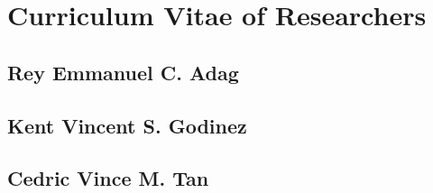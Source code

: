 \chapter{Curriculum Vitae of Researchers}
\label{app:cv_researchers}


\section*{Rey Emmanuel C. Adag}

\section*{Kent Vincent S. Godinez}

\section*{Cedric Vince M. Tan}
